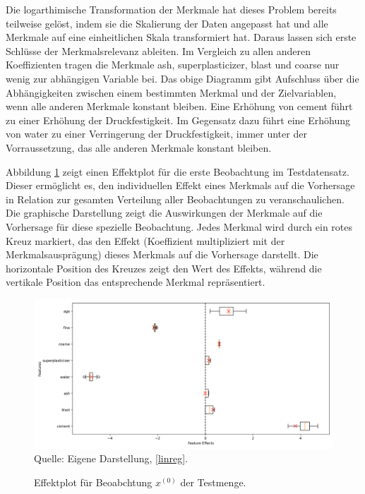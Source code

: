 Die logarthimische Transformation der Merkmale hat dieses Problem bereits 
teilweise gelöst, indem sie die Skalierung der Daten angepasst hat und alle Merkmale auf eine einheitlichen Skala transformiert hat.
Daraus lassen sich erste Schlüsse der Merkmalsrelevanz ableiten. Im Vergleich zu allen anderen 
Koeffizienten tragen die Merkmale ash, superplasticizer, blast und coarse nur wenig zur abhängigen
Variable bei. 
Das obige Diagramm gibt Aufschluss über die Abhängigkeiten zwischen einem bestimmten Merkmal und der Zielvariablen, 
wenn alle anderen Merkmale konstant bleiben. Eine Erhöhung von cement führt zu einer Erhöhung der Druckfestigkeit. 
Im Gegensatz dazu führt eine Erhöhung von water zu einer Verringerung der Druckfestigkeit, immer unter der Vorraussetzung, das alle
anderen Merkmale konstant bleiben.

Abbildung \ref{pic:effect} zeigt einen Effektplot für die erste Beobachtung im Testdatensatz. Dieser 
ermöglicht es, den individuellen Effekt eines Merkmals auf die Vorhersage in Relation zur gesamten 
Verteilung aller Beobachtungen zu veranschaulichen. Die graphische Darstellung zeigt die Auswirkungen 
der Merkmale auf die Vorhersage für diese spezielle Beobachtung. 
Jedes Merkmal wird durch ein rotes Kreuz markiert, das den Effekt (Koeffizient multipliziert mit der Merkmalsausprägung) dieses 
Merkmals auf die Vorhersage darstellt. 
Die horizontale Position des Kreuzes zeigt den Wert des Effekts, während die vertikale Position das entsprechende Merkmal repräsentiert.

\begin{figure}[!h]
    \caption{Effektplot für Beoabchtung $x^{(0)}$ der Testmenge.}
    \includegraphics[width=1\textwidth]{../scripts/images/feature_effects_boxplot.png}
    Quelle: Eigene Darstellung, \ref{linreg}.
    \label{pic:effect}
\end{figure}

